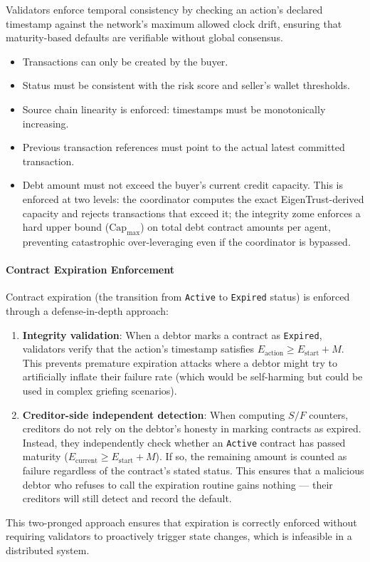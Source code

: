 \documentclass[11pt]{article}
\begin{document}
Validators enforce temporal consistency by checking an action's declared timestamp against the network's maximum allowed clock drift, ensuring that maturity-based defaults are verifiable without global consensus.
\begin{itemize}
    \item Transactions can only be created by the buyer.
    \item Status must be consistent with the risk score and seller's wallet thresholds.
    \item Source chain linearity is enforced: timestamps must be monotonically increasing.
    \item Previous transaction references must point to the actual latest committed transaction.
    \item Debt amount must not exceed the buyer's current credit capacity. This is enforced at two levels: the coordinator computes the exact EigenTrust-derived capacity and rejects transactions that exceed it; the integrity zome enforces a hard upper bound ($\text{Cap}_{\max}$) on total debt contract amounts per agent, preventing catastrophic over-leveraging even if the coordinator is bypassed.
\end{itemize}

\paragraph{Contract Expiration Enforcement}
Contract expiration (the transition from \texttt{Active} to \texttt{Expired} status) is enforced through a defense-in-depth approach:
\begin{enumerate}
    \item \textbf{Integrity validation}: When a debtor marks a contract as \texttt{Expired}, validators verify that the action's timestamp satisfies $E_{\text{action}} \geq E_{\text{start}} + M$. This prevents premature expiration attacks where a debtor might try to artificially inflate their failure rate (which would be self-harming but could be used in complex griefing scenarios).
    \item \textbf{Creditor-side independent detection}: When computing $S/F$ counters, creditors do not rely on the debtor's honesty in marking contracts as expired. Instead, they independently check whether an \texttt{Active} contract has passed maturity ($E_{\text{current}} \geq E_{\text{start}} + M$). If so, the remaining amount is counted as failure regardless of the contract's stated status. This ensures that a malicious debtor who refuses to call the expiration routine gains nothing --- their creditors will still detect and record the default.
\end{enumerate}
This two-pronged approach ensures that expiration is correctly enforced without requiring validators to proactively trigger state changes, which is infeasible in a distributed system.
\end{document}
